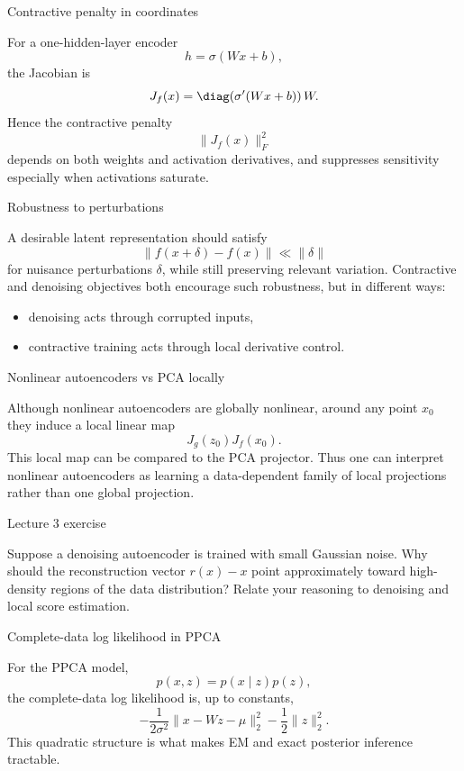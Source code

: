 \documentclass[aspectratio=169]{beamer}
\begin{document}
\begin{frame}{Contractive penalty in coordinates}

For a one-hidden-layer encoder
\[
h = \sigma(Wx+b),
\]
the Jacobian is
\[
J_f(x)=\diag(\sigma'(Wx+b))\,W.
\]
Hence the contractive penalty
\[
\|J_f(x)\|_F^2
\]
depends on both weights and activation derivatives, and suppresses sensitivity especially when activations saturate.

\end{frame}

\begin{frame}{Robustness to perturbations}

A desirable latent representation should satisfy
\[
\|f(x+\delta)-f(x)\| \ll \|\delta\|
\]
for nuisance perturbations \(\delta\), while still preserving relevant variation.
Contractive and denoising objectives both encourage such robustness, but in different ways:
\begin{itemize}
\item denoising acts through corrupted inputs,
\item contractive training acts through local derivative control.
\end{itemize}

\end{frame}

\begin{frame}{Nonlinear autoencoders vs PCA locally}

Although nonlinear autoencoders are globally nonlinear, around any point \(x_0\) they induce a local linear map
\[
J_g(z_0)J_f(x_0).
\]
This local map can be compared to the PCA projector.
Thus one can interpret nonlinear autoencoders as learning a data-dependent family of local projections rather than one global projection.

\end{frame}

\begin{frame}{Lecture 3 exercise}

Suppose a denoising autoencoder is trained with small Gaussian noise.
Why should the reconstruction vector \(r(x)-x\) point approximately toward high-density regions of the data distribution?
Relate your reasoning to denoising and local score estimation.

\end{frame}

\begin{frame}{Complete-data log likelihood in PPCA}

For the PPCA model,
\[
p(x,z)=p(x\mid z)p(z),
\]
the complete-data log likelihood is, up to constants,
\[
-\frac{1}{2\sigma^2}\|x-Wz-\mu\|_2^2 - \frac{1}{2}\|z\|_2^2.
\]
This quadratic structure is what makes EM and exact posterior inference tractable.

\end{frame}
\end{document}
